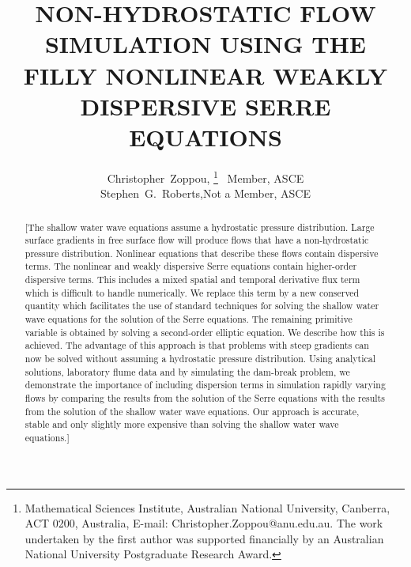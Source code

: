 \documentclass[SingleSpace,12pt]{Serre_ASCE}
\begin{document}
\title{NON-HYDROSTATIC FLOW SIMULATION USING THE FILLY NONLINEAR WEAKLY DISPERSIVE SERRE EQUATIONS}

\author{
Christopher~Zoppou,%
\thanks{Mathematical Sciences Institute, Australian National University, Canberra, ACT 0200, Australia, E-mail: Christopher.Zoppou@anu.edu.au. The work undertaken by the first author was supported financially by an Australian National University Postgraduate Research Award.}
\ Member, ASCE
%
\\
Stephen~G.~Roberts,\footnotemark[1] Not a Member, ASCE
}

\maketitle

\begin{abstract}

[The shallow water wave equations assume a hydrostatic pressure distribution. Large surface gradients in free surface flow will produce flows that have a non-hydrostatic pressure distribution. Nonlinear equations that describe these flows contain dispersive terms. The nonlinear and weakly dispersive Serre equations contain higher-order dispersive terms. This includes a mixed spatial and temporal derivative flux term which is difficult to handle numerically. We replace this term by a new conserved quantity which facilitates the use of standard techniques for solving the shallow water wave equations for the solution of the Serre equations. The remaining primitive variable is obtained by solving a second-order elliptic equation. We describe how this is achieved. The advantage of this approach is that problems with steep gradients can now be solved without assuming a hydrostatic pressure distribution. Using analytical solutions, laboratory flume data and by simulating the dam-break problem, we demonstrate the importance of including dispersion terms in simulation rapidly varying flows by comparing the results from the solution of the Serre equations with the results from the solution of the shallow water wave equations. Our approach is accurate, stable and only slightly more expensive than solving the shallow water wave equations.]

\end{abstract}

\end{document}
